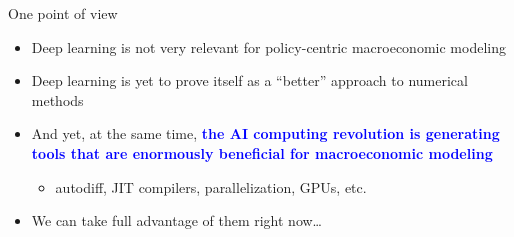\documentclass[
    xcolor={svgnames,dvipsnames},
    hyperref={colorlinks, citecolor=DeepPink4, linkcolor=DarkRed, urlcolor=DarkBlue}
    ]{beamer}  %
\newcommand{\navy}[1]{\textcolor{Blue}{\bf #1}}
\newcommand{\1}{\mathbbm 1}
\begin{document}
\begin{frame}
    
    One point of view

    \begin{itemize}
        \item Deep learning is not very relevant for policy-centric macroeconomic modeling
        \vspace{0.5em}
        \item Deep learning is yet to prove itself as a ``better'' approach to
            numerical methods
        \vspace{0.5em}
        \item And yet, at the same time, \navy{the AI computing revolution is
            generating tools that are enormously beneficial for macroeconomic
        modeling}
        \vspace{0.5em}
            \begin{itemize}
                \item autodiff, JIT compilers, parallelization, GPUs, etc.
            \end{itemize}
        \vspace{0.5em}
        \item We can take full advantage of them right now\ldots
    \end{itemize}

\end{frame}
\end{document}

